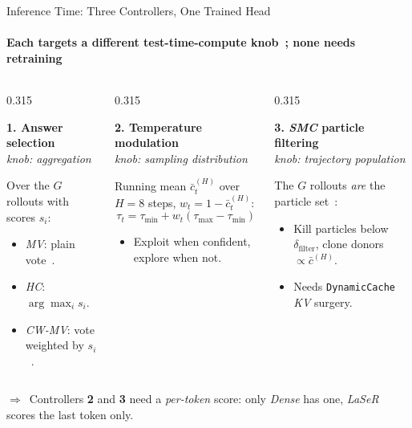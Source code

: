 \documentclass[aspectratio=169,10pt,t]{beamer}
\DeclareRobustCommand{\acit}[1]{\textit{\acs{#1}}}
\newcommand{\takeaway}[1]{%
	\vfill
	\setlength{\fboxsep}{4pt}%
	\noindent\colorbox{jkulight}{%
		\begin{minipage}{\dimexpr\textwidth-2\fboxsep\relax}%
			\footnotesize\raggedright\color{jkunavy}%
			\textcolor{jkumagenta}{\textbf{$\Rightarrow$}}~#1%
		\end{minipage}}%
	\vspace{1pt}%
}
\newcommand{\headline}[1]{%
	\setlength{\fboxsep}{4pt}%
	\noindent\colorbox{jkulight}{%
		\begin{minipage}{\dimexpr\textwidth-2\fboxsep\relax}%
			\footnotesize\raggedright\color{jkunavy}#1%
		\end{minipage}}%
	\vspace{0.18cm}%
}
\begin{document}
\begin{frame}{Inference Time: Three Controllers, One Trained Head}
	\framesubtitle{Each targets a different test-time-compute knob~\citep{testtimecomputescaling}; none needs retraining}
	\begin{columns}[T, onlytextwidth]
		\begin{column}{0.315\textwidth}
			\headline{\textbf{1. Answer selection}\\[1pt]\emph{knob: aggregation}}
			\small
			Over the $G$ rollouts with scores $s_i$:
			\begin{itemize}
				\item \acit{MV}: plain vote~\citep{selfconsistency}.
				\item \acit{HC}: $\arg\max_i s_i$.
				\item \acit{CW-MV}: vote weighted by $s_i$~\citep{deepthinkwithconfidence}.
			\end{itemize}
		\end{column}
		\begin{column}{0.315\textwidth}
			\headline{\textbf{2. Temperature modulation}\\[1pt]\emph{knob: sampling distribution}}
			\small
			Running mean $\bar c^{(H)}_t$ over $H\!=\!8$ steps, $w_t = 1-\bar c^{(H)}_t$:
			\vspace{-0.1cm}
			\[
				\tau_t = \tau_{\min} + w_t(\tau_{\max}-\tau_{\min})
			\]
			\vspace{-0.4cm}
			\begin{itemize}
				\item Exploit when confident, explore when not.
			\end{itemize}
		\end{column}
		\begin{column}{0.315\textwidth}
			\headline{\textbf{3. \acit{SMC} particle filtering}\\[1pt]\emph{knob: trajectory population}}
			\small
			The $G$ rollouts \emph{are} the particle set~\citep{smcsteering, twistedsmc}:
			\begin{itemize}
				\item Kill particles below $\delta_{\mathrm{filter}}$, clone donors $\propto \bar c^{(H)}$.
				\item Needs \texttt{DynamicCache} \acit{KV} surgery.
			\end{itemize}
		\end{column}
	\end{columns}
	\takeaway{Controllers \textbf{2} and \textbf{3} need a \emph{per-token} score: only \textit{Dense} has one, \acit{LaSeR} scores the last token only.}
\end{frame}
\end{document}

